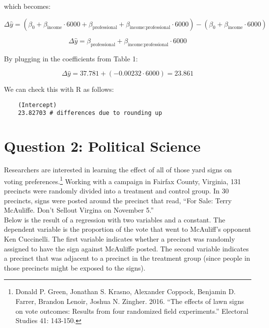\documentclass[12pt,letterpaper]{article}
\begin{document}
\begin{enumerate}
	which becomes: 
	
  $$\Delta \hat{y} = \left( \beta_0 + \beta_{\text{income}} \cdot 6000 + \beta_{\text{professional}} + \beta_{\text{income:professional}} \cdot 6000 \right) - \left( \beta_0 + \beta_{\text{income}} \cdot 6000 \right)$$
  
  
  $$\Delta \hat{y} = \beta_{\text{professional}} + \beta_{\text{income:professional}} \cdot 6000$$
  
  By plugging in the coefficients from Table 1: 
  
  $$\Delta \hat{y} = 37.781 + (-0.00232 \cdot 6000) = 23.861 $$
  
  We can check this with R as follows: 
    
    \begin{verbatim}
   	(Intercept)    
   	23.82703 # differences due to rounding up
    \end{verbatim}
	

	
	 
	
\end{enumerate}

\newpage

\section*{Question 2: Political Science}
\vspace{.25cm}
\noindent 	Researchers are interested in learning the effect of all of those yard signs on voting preferences.\footnote{Donald P. Green, Jonathan	S. Krasno, Alexander Coppock, Benjamin D. Farrer,	Brandon Lenoir, Joshua N. Zingher. 2016. ``The effects of lawn signs on vote outcomes: Results from four randomized field experiments.'' Electoral Studies 41: 143-150. } Working with a campaign in Fairfax County, Virginia, 131 precincts were randomly divided into a treatment and control group. In 30 precincts, signs were posted around the precinct that read, ``For Sale: Terry McAuliffe. Don't Sellout Virgina on November 5.'' \\

Below is the result of a regression with two variables and a constant.  The dependent variable is the proportion of the vote that went to McAuliff's opponent Ken Cuccinelli. The first variable indicates whether a precinct was randomly assigned to have the sign against McAuliffe posted. The second variable indicates
a precinct that was adjacent to a precinct in the treatment group (since people in those precincts might be exposed to the signs).  \\
\end{document}
